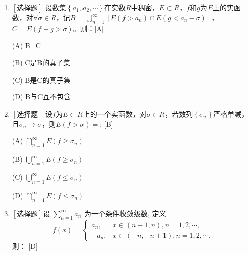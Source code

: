 \documentclass{article}
\begin{document}
\begin{enumerate}
    
    \item $\left[\textbf{选择题}\right]$ 设数集$\left\{a_1,a_2,\cdots\right\}$在实数$R$中稠密，$E\subset R$，$f$和$g$为$E$上的实函数，对$\forall \sigma\in R$，记$B=\bigcup_{n=1}^{\infty}\left[E\left(f>a_n\right)\cap E\left(g<a_n-\sigma\right)\right]$，$C=E\left(f-g>\sigma\right)$。则：\hfill [A]
    
    \begin{minipage}[t]{0.45\linewidth}
    (A) B=C
    \end{minipage}
    \hfill
    \begin{minipage}[t]{0.45\linewidth}
    (B) C是B的真子集
    \end{minipage}
    \begin{minipage}[t]{0.45\linewidth}
    (C) B是C的真子集
    \end{minipage}
    \hfill
    \begin{minipage}[t]{0.45\linewidth}
    (D) B与C互不包含
    \end{minipage}

    \item $\left[\textbf{选择题}\right]$ 设$f$为$E \subset R$上的一个实函数，对$\sigma \in R$，若数列$\left\{\sigma_n\right\}$严格单减，且$\sigma_n \to \sigma$，则$E\left(f > \sigma\right)=$: \hfill [B]

    \begin{minipage}[t]{0.45\linewidth}
    (A) $\bigcap_{n=1}^{\infty}E\left(f\geq\sigma_n \right)$
    \end{minipage}
    \hfill
    \begin{minipage}[t]{0.45\linewidth}
    (B) $\bigcup_{n=1}^{\infty}E\left(f\geq\sigma_n \right)$
    \end{minipage}
    \begin{minipage}[t]{0.45\linewidth}
    (C) $\bigcup_{n=1}^{\infty}E\left(f\leq\sigma_n \right)$
    \end{minipage}
    \hfill
    \begin{minipage}[t]{0.45\linewidth}
    (D) $\bigcap_{n=1}^{\infty}E\left(f\leq\sigma_n \right)$
    \end{minipage}

    \item $\left[\textbf{选择题}\right]$设 $\sum_{n=1}^{\infty} a_n$ 为一个条件收敛级数, 定义
    $$
    f(x)=\left\{\begin{array}{lc}
    a_n, & x \in(n-1, n), n=1,2, \cdots, \\
    -a_n, & x \in(-n,-n+1), n=1,2, \cdots,
    \end{array}\right.
    $$
    则： \hfill [D]


\end{enumerate}
\end{document}
